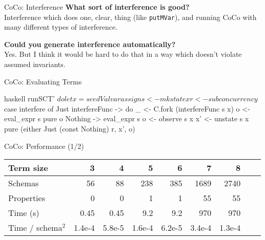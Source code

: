 \documentclass{beamer}
\begin{document}
\begin{frame}{CoCo: Interference}
  \textbf{What sort of interference is good?}\\
  Interference which does one, clear, thing (like \texttt{putMVar}),
  and running CoCo with many different types of interference.

  \textbf{Could you generate interference automatically?}\\
  Yes.  But I think it would be hard to do that in a way which doesn't
  violate assumed invariants.
\end{frame}

\begin{frame}[fragile]{CoCo: Evaluating Terms}
\begin{center}
\begin{cminted}{haskell}
runSCT' $ do
  let x = seedVal varassign
  s <- mkstate x
  r <- subconcurrency $ case interfere of
    Just interfereFunc -> do
      _ <- C.fork (interfereFunc s x)
      o <- eval_expr s
      pure o
    Nothing ->
      eval_expr s
  o  <- observe s x
  x' <- unstate s x
  pure (either Just (const Nothing) r, x', o)
\end{cminted}
\end{center}
\end{frame}

\begin{frame}{CoCo: Performance \hfill \footnotesize (1/2)}
\begin{center}
\begin{tabular}{lrrrrrrrr} \toprule
  Term size           &   3    &   4    &     5   &     6   &      7 &      8 \\ \midrule
  Schemas             &  56    &  88    &   238   &   385   &   1689 &   2740 \\
  Properties          &   0    &   0    &     1   &     1   &     55 &     55 \\
  Time (s)            &   0.45 &   0.45 &     9.2 &     9.2 &    970 &    970 \\ \midrule
  Time / schema$^{2}$ &  1.4e-4 & 5.8e-5 & 1.6e-4  & 6.2e-5  & 3.4e-4 & 1.3e-4 \\ \bottomrule
\end{tabular}
\end{center}
\end{frame}
\end{document}
